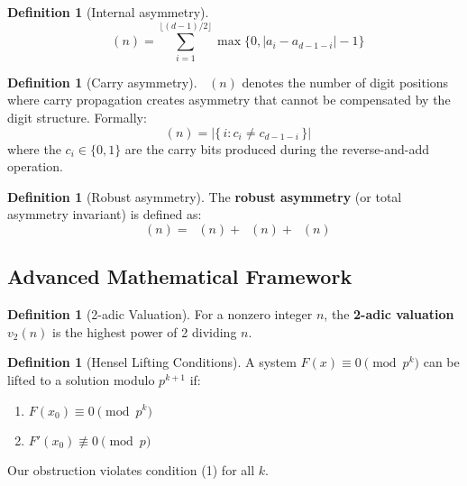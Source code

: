 \documentclass[11pt,a4paper]{article}
\theoremstyle{plain}
\theoremstyle{definition}
\newtheorem{definition}[theorem]{Definition}
\DeclareMathOperator{\Aext}{A^{\text{(ext)}}}
\DeclareMathOperator{\Aint}{A^{\text{(int)}}}
\DeclareMathOperator{\Acarry}{A^{\text{(carry)}}}
\DeclareMathOperator{\Arobust}{A^{\text{(robust)}}}
\begin{document}
\begin{definition}[Internal asymmetry]
\begin{equation}
\Aint(n) = \sum_{i=1}^{\lfloor (d-1)/2 \rfloor} \max\{0, |a_i - a_{d-1-i}| - 1\}
\end{equation}
\end{definition}

\begin{definition}[Carry asymmetry]
$\Acarry(n)$ denotes the number of digit positions where carry propagation
creates asymmetry that cannot be compensated by the digit structure.
Formally:
\[
\Acarry(n) = \big|\{\,i : c_i \neq c_{d-1-i}\,\}\big|
\]
where the $c_i\in\{0,1\}$ are the carry bits produced during the reverse-and-add operation.
\end{definition}

\begin{definition}[Robust asymmetry]
The \textbf{robust asymmetry} (or total asymmetry invariant) is defined as:
\begin{equation}
\Arobust(n) = \Aext(n) + \Aint(n) + \Acarry(n)
\end{equation}
\end{definition}

\subsection{Advanced Mathematical Framework}

\begin{definition}[2-adic Valuation]
For a nonzero integer $n$, the \textbf{2-adic valuation} $v_2(n)$ is the highest power of 2 dividing $n$.
\end{definition}

\begin{definition}[Hensel Lifting Conditions]
A system $F(x) \equiv 0 \pmod{p^k}$ can be lifted to a solution modulo $p^{k+1}$ if:
\begin{enumerate}
\item $F(x_0) \equiv 0 \pmod{p^k}$
\item $F'(x_0) \not\equiv 0 \pmod{p}$
\end{enumerate}
Our obstruction violates condition (1) for all $k$.
\end{definition}

\end{document}
